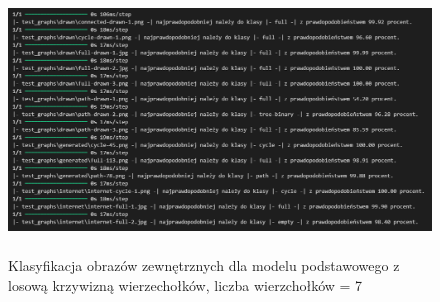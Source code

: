\begin{figure}[ht]
	\centering
	\includegraphics[height=7cm]{resources/tests/images/v3/base7_txt.png}
	\caption{Klasyfikacja obrazów zewnętrznych dla modelu podstawowego z losową krzywizną wierzechołków, liczba wierzchołków = 7}
	\label{Fig:tests-base-8}
\end{figure}
\FloatBarrier